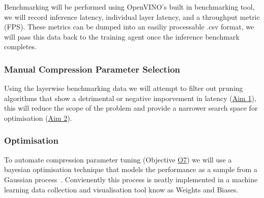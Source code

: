 \documentclass[../D1.tex]{subfiles}
\begin{document}
Benchmarking will be performed using OpenVINO's built in benchmarking tool, we will record inference latency, individual layer latency, and a throughput metric (FPS). 
These metrics can be dumped into an easiliy processable .csv format, we will pass this data back to the training agent once the inference benchmark completes.


\subsubsection{Manual Compression Parameter Selection}
Using the layerwise benchmarking data we will attempt to filter out pruning algorithms that show a detrimental or negative imporvement in latency (\hyperref[Aim1]{Aim 1}), this will reduce the scope of the problem and provide a narrower search space for optimisation (\hyperref[Aim2]{Aim 2}).

\subsubsection{Optimisation}
To automate compression parameter tuning (Objective \hyperref[obj:CompPara]{O7}) we will use a bayesian optimisation technique that models the performance as a sample from a Gaussian process~\autocite{snoekPracticalBayesianOptimization2012}.
Convienently this process is neatly implemented in a machine learning data collection and visualisation tool know as Weights and Biases.
\end{document}
